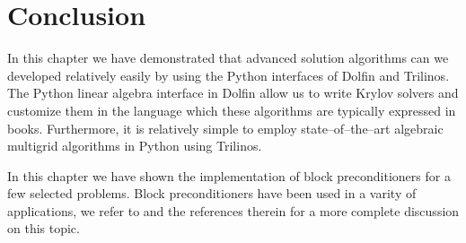 \section{Conclusion}
In this chapter we have demonstrated that advanced solution algorithms can we developed
relatively easily by using the Python interfaces of Dolfin and Trilinos. The Python linear
algebra interface in Dolfin  allow us to write  Krylov solvers and customize them 
in the language which these algorithms are typically expressed in books. 
Furthermore, it is relatively simple to employ state--of--the--art algebraic multigrid 
algorithms in Python using Trilinos. 

In this chapter we have shown the implementation of block preconditioners for a few selected problems. 
Block preconditioners have been used in a varity of applications, we refer to \cite{M-W-09}
and the references therein for a more complete discussion on this topic. 



